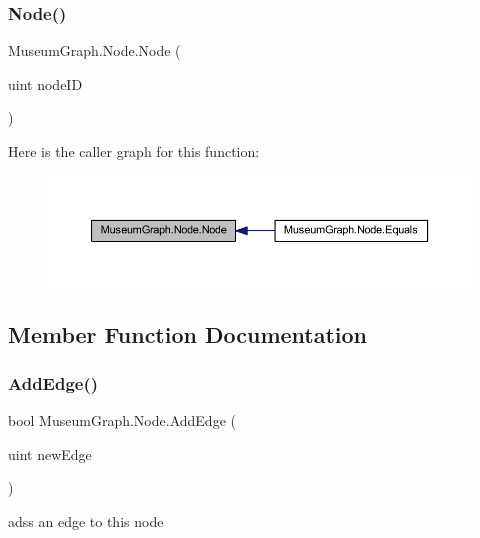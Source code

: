 \subsubsection{\texorpdfstring{Node()}{Node()}}
{\footnotesize\ttfamily Museum\+Graph.\+Node.\+Node (\begin{DoxyParamCaption}\item[{uint}]{node\+ID }\end{DoxyParamCaption})}

Here is the caller graph for this function\+:
\nopagebreak
\begin{figure}[H]
\begin{center}
\leavevmode
\includegraphics[width=350pt]{class_museum_graph_1_1_node_a917a203c77b5aa5e65c7293ba896d2c1_icgraph}
\end{center}
\end{figure}


\subsection{Member Function Documentation}
\mbox{\label{class_museum_graph_1_1_node_adecbc3b471d15c5480d4c13e9502ac27}} 
\subsubsection{\texorpdfstring{Add\+Edge()}{AddEdge()}}
{\footnotesize\ttfamily bool Museum\+Graph.\+Node.\+Add\+Edge (\begin{DoxyParamCaption}\item[{uint}]{new\+Edge }\end{DoxyParamCaption})}



adss an edge to this node 


